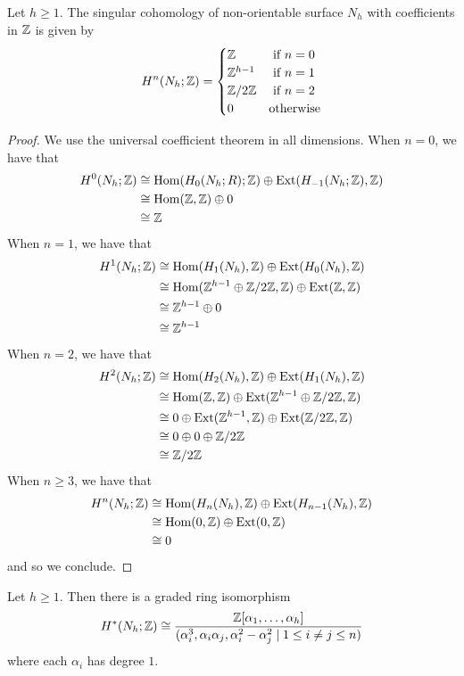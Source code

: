 \documentclass[a4paper]{article}
\begin{document}
\begin{prp}{}{} Let $h\geq 1$. The singular cohomology of non-orientable surface $N_h$ with coefficients in $\mathbb{Z}$ is given by $$H^n(N_h;\mathbb{Z})=\begin{cases}
\mathbb{Z} & \text{ if } n=0\\
\mathbb{Z}^{h-1} & \text{ if } n=1\\
\mathbb{Z}/2\mathbb{Z} & \text{ if } n=2\\
0 & \text{otherwise}
\end{cases}$$ \tcbline
\begin{proof}
We use the universal coefficient theorem in all dimensions. 
When $n=0$, we have that 
\begin{align*}
H^0(N_h;\mathbb{Z})&\cong\operatorname{Hom}(H_0(N_h;R);\mathbb{Z})\oplus\text{Ext}(H_{-1}(N_h;\mathbb{Z}),\mathbb{Z})\\
&\cong\operatorname{Hom}(\mathbb{Z},\mathbb{Z})\oplus 0\\
&\cong\mathbb{Z}
\end{align*}
When $n=1$, we have that 
\begin{align*}
H^1(N_h;\mathbb{Z})&\cong\operatorname{Hom}(H_1(N_h),\mathbb{Z})\oplus\text{Ext}(H_0(N_h),\mathbb{Z})\\
&\cong\operatorname{Hom}(\mathbb{Z}^{h-1}\oplus\mathbb{Z}/2\mathbb{Z},\mathbb{Z})\oplus\text{Ext}(\mathbb{Z},\mathbb{Z})\\
&\cong\mathbb{Z}^{h-1}\oplus 0\\
&\cong\mathbb{Z}^{h-1}
\end{align*}
When $n=2$, we have that 
\begin{align*}
H^2(N_h;\mathbb{Z})&\cong\operatorname{Hom}(H_2(N_h),\mathbb{Z})\oplus\text{Ext}(H_1(N_h),\mathbb{Z})\\
&\cong\operatorname{Hom}(\mathbb{Z},\mathbb{Z})\oplus\text{Ext}(\mathbb{Z}^{h-1}\oplus\mathbb{Z}/2\mathbb{Z},\mathbb{Z})\\
&\cong 0\oplus\text{Ext}(\mathbb{Z}^{h-1},\mathbb{Z})\oplus\text{Ext}(\mathbb{Z}/2\mathbb{Z},\mathbb{Z})\\
&\cong 0\oplus 0\oplus \mathbb{Z}/2\mathbb{Z}\\
&\cong\mathbb{Z}/2\mathbb{Z}
\end{align*}
When $n\geq 3$, we have that 
\begin{align*}
H^n(N_h;\mathbb{Z})&\cong\operatorname{Hom}(H_n(N_h),\mathbb{Z})\oplus\text{Ext}(H_{n-1}(N_h),\mathbb{Z})\\
&\cong\operatorname{Hom}(0,\mathbb{Z})\oplus\text{Ext}(0,\mathbb{Z})\\
&\cong 0
\end{align*}
and so we conclude. 
\end{proof}
\end{prp}

\begin{prp}{}{} Let $h\geq 1$. Then there is a graded ring isomorphism $$H^\ast(N_h;\mathbb{Z})\cong\frac{\mathbb{Z}[\alpha_1,\dots,\alpha_h]}{(\alpha_i^3,\alpha_i\alpha_j,\alpha_i^2-\alpha_j^2\;|\;1\leq i\neq j\leq n)}$$ where each $\alpha_i$ has degree $1$. 
\end{prp}
\end{document}
